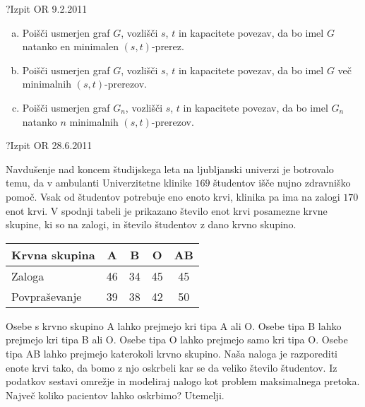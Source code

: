 \begin{naloga}{?}{Izpit OR 9.2.2011}
\begin{vprasanje}
\begin{enumerate}[(a)]
\item Poišči usmerjen graf $G$, vozlišči $s$, $t$ in kapacitete povezav,
da bo imel $G$ natanko en minimalen $(s, t)$-prerez.

\item Poišči usmerjen graf $G$, vozlišči $s$, $t$ in kapacitete povezav,
da bo imel $G$ več minimalnih $(s, t)$-prerezov.

\item Poišči usmerjen graf $G_n$, vozlišči $s$, $t$ in kapacitete povezav,
da bo imel $G_n$ natanko $n$ minimalnih $(s, t)$-prerezov.
\end{enumerate}
\end{vprasanje}
\begin{odgovor}
\end{odgovor}
\end{naloga}


\begin{naloga}{?}{Izpit OR 28.6.2011}
\begin{vprasanje}
Navdušenje nad koncem študijskega leta na ljubljanski univerzi
je botrovalo temu,
da v ambulanti Univerzitetne klinike
$169$ študentov išče nujno zdravniško pomoč.
Vsak od študentov potrebuje eno enoto krvi,
klinika pa ima na zalogi $170$ enot krvi.
V spodnji tabeli je prikazano število enot krvi posamezne krvne skupine,
ki so na zalogi,
in število študentov z dano krvno skupino.
\begin{center}
\begin{tabular}{l|cccc}
Krvna skupina &  A &  B &  O & AB \\ \hline
Zaloga        & 46 & 34 & 45 & 45 \\
Povpraševanje & 39 & 38 & 42 & 50
\end{tabular}
\end{center}
Osebe s krvno skupino A lahko prejmejo kri tipa A ali O.
Osebe tipa B lahko prejmejo kri tipa B ali O.
Osebe tipa O lahko prejmejo samo kri tipa O.
Osebe tipa AB lahko prejmejo katerokoli krvno skupino.
Naša naloga je razporediti enote krvi tako,
da bomo z njo oskrbeli kar se da veliko število študentov.
Iz podatkov sestavi omrežje
in modeliraj nalogo kot problem maksimalnega pretoka.
Največ koliko pacientov lahko oskrbimo?
Utemelji.
\end{vprasanje}
\begin{odgovor}
\end{odgovor}
\end{naloga}



